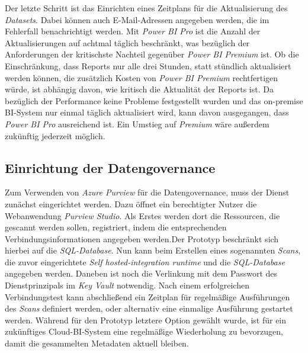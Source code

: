 Der letzte Schritt ist das Einrichten eines Zeitplans für die Aktualisierung des \textit{Datasets}. Dabei können auch E-Mail-Adressen angegeben werden, die im Fehlerfall benachrichtigt werden. Mit \textit{Power BI Pro} ist die Anzahl der Aktualisierungen auf achtmal täglich beschränkt, was bezüglich der Anforderungen der kritischste Nachteil gegenüber \textit{Power BI Premium} ist. Ob die Einschränkung, dass Reports nur alle drei Stunden, statt stündlich aktualisiert werden können, die zusätzlich Kosten von \textit{Power BI Premium} rechtfertigen würde, ist abhängig davon, wie kritisch die Aktualität der Reports ist. Da bezüglich der Performance keine Probleme festgestellt wurden und das on-premise BI-System nur einmal täglich aktualisiert wird, kann davon ausgegangen, dass \textit{Power BI Pro} ausreichend ist. Ein Umstieg auf \textit{Premium} wäre außerdem zukünftig jederzeit möglich. 

\cite[vgl.][]{pearson_pro_2020}

\subsection{Einrichtung der Datengovernance}
Zum Verwenden von \textit{Azure Purview} für die Datengovernance, muss der Dienst zunächst eingerichtet werden. Dazu öffnet ein berechtigter Nutzer die Webanwendung \textit{Purview Studio}. Als Erstes werden dort die Ressourcen, die gescannt werden sollen, registriert, indem die entsprechenden Verbindungsinformationen angegeben werden.Der Prototyp beschränkt sich hierbei auf die \textit{SQL-Database}. Nun kann beim Erstellen eines sogenannten \textit{Scans}, die zuvor eingerichtete \textit{Self hosted-integration runtime} und die \textit{SQL-Database} angegeben werden. Daneben ist noch die Verlinkung mit dem Passwort des Dienstprinzipals im \textit{Key Vault} notwendig. Nach einem erfolgreichen Verbindungstest kann abschließend ein Zeitplan für regelmäßige Ausführungen des \textit{Scans} definiert werden, oder alternativ eine einmalige Ausführung gestartet werden. Während für den Prototyp letztere Option gewählt wurde, ist für ein zukünftiges Cloud-BI-System eine regelmäßige Wiederholung zu bevorzugen, damit die gesammelten Metadaten aktuell bleiben. 

